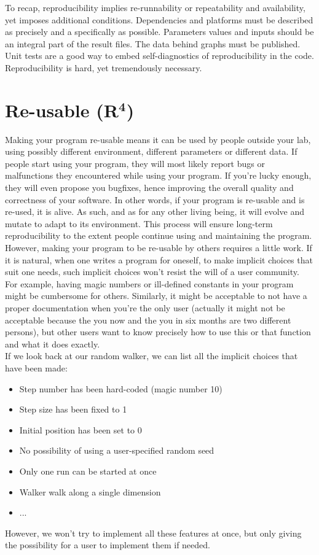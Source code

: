 \documentclass[a4paper,11pt]{article}
\begin{document}
To recap, reproducibility implies re-runnability or repeatability and availability, yet  imposes additional conditions. Dependencies and platforms must be described as precisely and a specifically as possible. Parameters values and inputs should be an integral part of the result files. The data behind graphs must be published. Unit tests are a good way to embed self-diagnostics of reproducibility in the code. Reproducibility is hard, yet tremendously necessary.


\clearpage
\section*{Re-usable (R$^{\mathbf 4}$)}

Making your program re-usable means it can be used by people outside your lab,
using possibly different environment, different parameters or different data.
If people start using your program, they will most likely report bugs or malfunctions they encountered while using your program.
If you're lucky enough, they will even propose you bugfixes, hence improving the overall quality and correctness of your software.
In other words, if your program is re-usable and is re-used, it is alive.
As such, and as for any other living being, it will evolve and mutate to adapt to its environment.
This process will ensure long-term reproducibility to the extent people continue using and maintaining the program.\\

However, making your program to be re-usable by others requires a little work. If it is natural, when one writes a program for oneself, to make implicit choices that suit one needs, such implicit choices won't resist the will of a user community. For example, having magic numbers or ill-defined constants in your program might be cumbersome for others. Similarly, it might be acceptable to not have a proper documentation when you're the only user (actually it might not be acceptable because the you now and the you in six months are two different persons), but other users want to know precisely how to use this or that function and what it does exactly.\\


If we look back at our random walker, we can list all the implicit choices that have been made:
\begin{itemize}
\item Step number has been hard-coded (magic number 10)
\item Step size has been fixed to 1
\item Initial position has been set to 0
\item No possibility of using a user-specified random seed
\item Only one run can be started at once
\item Walker walk along a single dimension
\item ...
\end{itemize}
However, we won't try to implement all these features at once, but only giving the possibility for a user to implement them if needed.
\end{document}
